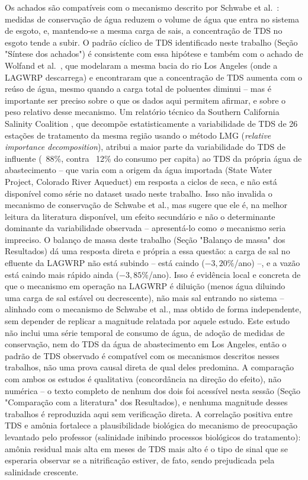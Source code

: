 Os achados são compatíveis com o mecanismo descrito por Schwabe et al.\ \cite{schwabe2020unintended}: medidas de conservação de água reduzem o volume de água que entra no sistema de esgoto, e, mantendo-se a mesma carga de sais, a concentração de TDS no esgoto tende a subir. O padrão cíclico de TDS identificado neste trabalho (Seção "Síntese dos achados") é consistente com essa hipótese e também com o achado de Wolfand et al.\ \cite{wolfand2022dilution}, que modelaram a mesma bacia do rio Los Angeles (onde a LAGWRP descarrega) e encontraram que a concentração de TDS aumenta com o reúso de água, mesmo quando a carga total de poluentes diminui -- mas é importante ser preciso sobre o que os dados aqui permitem afirmar, e sobre o peso relativo desse mecanismo. Um relatório técnico da Southern California Salinity Coalition \cite{scsc2018tds}, que decompõe estatisticamente a variabilidade de TDS de 26 estações de tratamento da mesma região usando o método LMG (\textit{relative importance decomposition}), atribui a maior parte da variabilidade do TDS de influente (~88\%, contra ~12\% do consumo per capita) ao TDS da própria água de abastecimento -- que varia com a origem da água importada (State Water Project, Colorado River Aqueduct) em resposta a ciclos de seca, e não está disponível como série no dataset usado neste trabalho. Isso não invalida o mecanismo de conservação de Schwabe et al., mas sugere que ele é, na melhor leitura da literatura disponível, um efeito secundário e não o determinante dominante da variabilidade observada -- apresentá-lo como \textit{o} mecanismo seria impreciso. O balanço de massa deste trabalho (Seção "Balanço de massa" dos Resultados) dá uma resposta direta e própria a essa questão: a carga de sal no efluente da LAGWRP não está subindo -- está caindo ($-3{,}20\%$/ano) --, e a vazão está caindo mais rápido ainda ($-3{,}85\%$/ano). Isso é evidência local e concreta de que o mecanismo em operação na LAGWRP é diluição (menos água diluindo uma carga de sal estável ou decrescente), não mais sal entrando no sistema -- alinhado com o mecanismo de Schwabe et al., mas obtido de forma independente, sem depender de replicar a magnitude relatada por aquele estudo. Este estudo não inclui uma série temporal de consumo de água, de adoção de medidas de conservação, nem do TDS da água de abastecimento em Los Angeles, então o padrão de TDS observado é compatível com os mecanismos descritos nesses trabalhos, não uma prova causal direta de qual deles predomina. A comparação com ambos os estudos é qualitativa (concordância na direção do efeito), não numérica -- o texto completo de nenhum dos dois foi acessível nesta sessão (Seção "Comparação com a literatura" dos Resultados), e nenhuma magnitude desses trabalhos é reproduzida aqui sem verificação direta. A correlação positiva entre TDS e amônia fortalece a plausibilidade biológica do mecanismo de preocupação levantado pelo professor (salinidade inibindo processos biológicos do tratamento): amônia residual mais alta em meses de TDS mais alto é o tipo de sinal que se esperaria observar se a nitrificação estiver, de fato, sendo prejudicada pela salinidade crescente.

